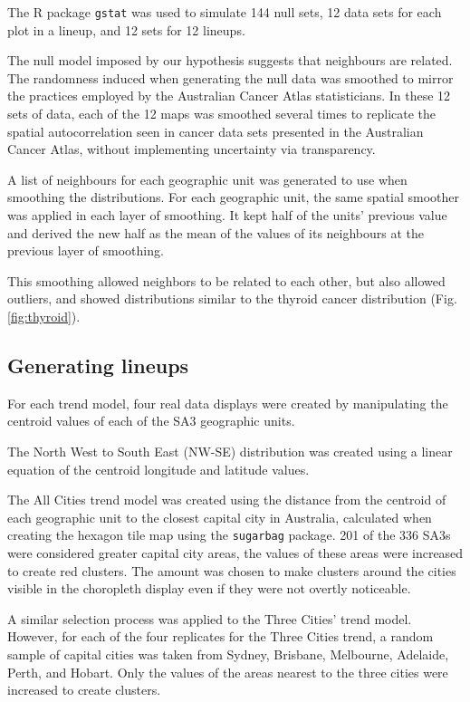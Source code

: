 \documentclass[times, doublespace]{anzsauth}
\begin{document}
The R package  \texttt{gstat} \citep{gstat} was used to
simulate 144 null sets, 12 data sets for each plot in a lineup, and 12
sets for 12 lineups.

The null model imposed by our hypothesis suggests that neighbours are
related. The randomness induced when generating the null data was
smoothed to mirror the practices employed by the Australian Cancer Atlas
statisticians. In these 12 sets of data, each of the 12 maps was
smoothed several times to replicate the spatial autocorrelation seen in
cancer data sets presented in the Australian Cancer Atlas, without
implementing uncertainty via transparency.

A list of neighbours for each geographic unit was generated to use when
smoothing the distributions. For each geographic unit, the same spatial
smoother was applied in each layer of smoothing. It kept half of the
units' previous value and derived the new half as the mean of the
values of its neighbours at the previous layer of smoothing.

This smoothing allowed neighbors to be related to each other, but also
allowed outliers, and showed distributions similar to the thyroid cancer
distribution (Fig. \ref{fig:thyroid}).

\subsection{Generating lineups}\label{generating-lineups}

For each trend model, four real data displays were created by
manipulating the centroid values of each of the SA3 geographic units.

The North West to South East (NW-SE) distribution was created using a
linear equation of the centroid longitude and latitude values.

The All Cities trend model was created using the distance from the
centroid of each geographic unit to the closest capital city in
Australia, calculated when creating the hexagon tile map using the
 \texttt{sugarbag} \citep{sugarbag} package. 201 of the 336 SA3s
were considered greater capital city areas, the values of these areas
were increased to create red clusters. The amount was chosen to make
clusters around the cities visible in the choropleth display even if
they were not overtly noticeable.

A similar selection process was applied to the Three Cities' trend
model. However, for each of the four replicates for the Three Cities
trend, a random sample of capital cities was taken from Sydney,
Brisbane, Melbourne, Adelaide, Perth, and Hobart. Only the values of the
areas nearest to the three cities were increased to create clusters.
\end{document}
